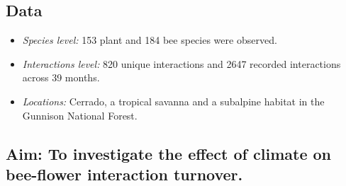 \documentclass[20pt,margin=5mm, innermargin=6mm, blockverticalspace=6mm, colspace=6mm]{tikzposter}
\begin{document}
{\begin{minipage}[]{0.5\linewidth}
  \end{minipage}   
  \hspace{.8cm}    
  \begin{minipage}[]{0.45\linewidth}
     \vspace{-15pt}
   \subsection*{Data}
    \begin{itemize}[itemsep=5pt,topsep=0pt,parsep=0pt,partopsep=0pt, leftmargin=20pt]
    \item \textit{Species level:} 153 plant and 184 bee species were observed.
    \item \textit{Interactions level:} 820 unique interactions and 2647 recorded interactions across 39 months.
    \item \textit{Locations:} Cerrado, a tropical savanna and  a subalpine habitat in the Gunnison National Forest.
    \end {itemize}
    \end{minipage}

    \subsection*{\centering Aim: \normalfont To investigate the effect of climate on bee-flower interaction turnover.} 
 }
\end{document}

